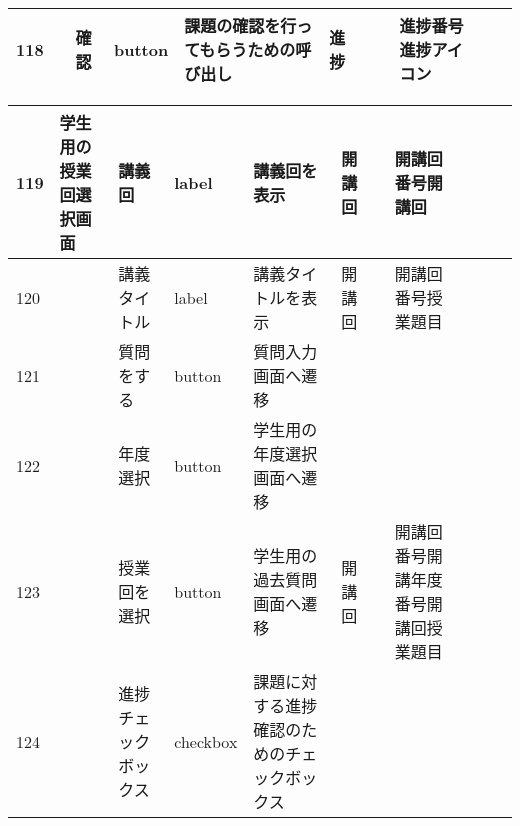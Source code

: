 \begin{table}[]
\begin{tabular}{|l|l|l|l|l|l|l|l|l|l|l|}
118 &               & 確認               & button   & 課題の確認を行ってもらうための呼び出し                                               & 進捗      &                       &                    & 進捗番号進捗アイコン      &                               &                                                                \\ \hline
\end{tabular}
\end{table}




\newpage
\begin{table}[]
\centering
\begin{tabular}{|l|l|l|l|l|l|l|l|l|l|l|}
\hline
119 & 学生用の授業回選択画面   & 講義回              & label    & 講義回を表示                                                            & 開講回     &                       & 開講回番号開講回           &                 &                               &                                                                \\ \hline
120 &               & 講義タイトル           & label    & 講義タイトルを表示                                                         & 開講回     &                       & 開講回番号授業題目          &                 &                               &                                                                \\ \hline
121 &               & 質問をする            & button   & 質問入力画面へ遷移                                                         &         &                       &                    &                 &                               &                                                                \\ \hline
122 &               & 年度選択             & button   & 学生用の年度選択画面へ遷移                                                     &         &                       &                    &                 &                               &                                                                \\ \hline
123 &               & 授業回を選択           & button   & 学生用の過去質問画面へ遷移                                                     & 開講回     &                       & 開講回番号開講年度番号開講回授業題目 &                 &                               &                                                                \\ \hline
124 &               & 進捗チェックボックス       & checkbox & 課題に対する進捗確認のためのチェックボックス                                            &         &                       &                    &                 &                               &                                                                \\ \hline

\end{tabular}
\end{table}
